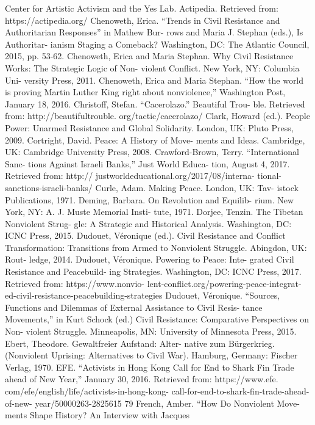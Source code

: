\documentclass[twoside,a4paper,12pt,fleqn,openany]{extbook}
\begin{document}
Center for Artistic Activism and the Yes Lab.
Actipedia. Retrieved from: https://actipedia.org/
Chenoweth, Erica. “Trends in Civil Resistance
and Authoritarian Responses” in Mathew Bur-
rows and Maria J. Stephan (eds.), Is Authoritar-
ianism Staging a Comeback? Washington, DC:
The Atlantic Council, 2015, pp. 53-62.
Chenoweth, Erica and Maria Stephan. Why Civil
Resistance Works: The Strategic Logic of Non-
violent Conflict. New York, NY: Columbia Uni-
versity Press, 2011.
Chenoweth, Erica and Maria Stephan. “How the
world is proving Martin Luther King right about
nonviolence,” Washington Post, January 18,
2016.
Christoff, Stefan. “Cacerolazo.” Beautiful Trou-
ble. Retrieved from: http://beautifultrouble.
org/tactic/cacerolazo/
Clark, Howard (ed.). People Power: Unarmed
Resistance and Global Solidarity. London, UK:
Pluto Press, 2009.
Cortright, David. Peace: A History of Move-
ments and Ideas. Cambridge, UK: Cambridge
University Press, 2008.
Crawford-Brown, Terry. “International Sanc-
tions Against Israeli Banks,” Just World Educa-
tion, August 4, 2017. Retrieved from: http://
justworldeducational.org/2017/08/interna-
tional-sanctions-israeli-banks/
Curle, Adam. Making Peace. London, UK: Tav-
istock Publications, 1971.
Deming, Barbara. On Revolution and Equilib-
rium. New York, NY: A. J. Muste Memorial Insti-
tute, 1971.
Dorjee, Tenzin. The Tibetan Nonviolent Strug-
gle: A Strategic and Historical Analysis.
Washington, DC: ICNC Press, 2015.
Dudouet, Véronique (ed.). Civil Resistance and
Conflict Transformation: Transitions from Armed
to Nonviolent Struggle. Abingdon, UK: Rout-
ledge, 2014.
Dudouet, Véronique. Powering to Peace: Inte-
grated Civil Resistance and Peacebuild-
ing Strategies. Washington, DC: ICNC Press,
2017. Retrieved from: https://www.nonvio-
lent-conflict.org/powering-peace-integrat-
ed-civil-resistance-peacebuilding-strategies
Dudouet, Véronique. “Sources, Functions and
Dilemmas of External Assistance to Civil Resis-
tance Movements,” in Kurt Schock (ed.) Civil
Resistance: Comparative Perspectives on Non-
violent Struggle. Minneapolis, MN: University of
Minnesota Press, 2015.
Ebert, Theodore. Gewaltfreier Aufstand: Alter-
native zum Bürgerkrieg. (Nonviolent Uprising:
Alternatives to Civil War). Hamburg, Germany:
Fischer Verlag, 1970.
EFE. “Activists in Hong Kong Call for End to
Shark Fin Trade ahead of New Year,” January
30, 2016. Retrieved from: https://www.efe.
com/efe/english/life/activists-in-hong-kong-
call-for-end-to-shark-fin-trade-ahead-of-new-
year/50000263-2825615
79
French, Amber. “How Do Nonviolent Move-
ments Shape History? An Interview with Jacques
\end{document}
